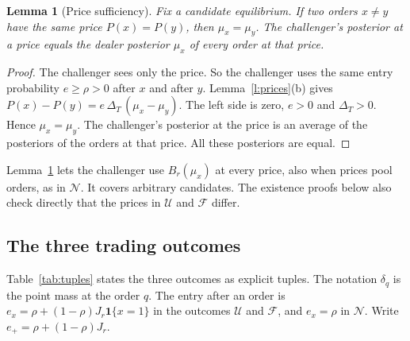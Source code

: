 \documentclass[12pt]{article}
\newtheorem{lemma}{Lemma}
\theoremstyle{definition}
\newcommand{\one}{\mathbf 1}
\begin{document}
\begin{lemma}[Price sufficiency]\label{l:suff}
Fix a candidate equilibrium.
If two orders $x\ne y$ have the same price $P(x)=P(y)$, then $\mu_x=\mu_y$.
The challenger's posterior at a price equals the dealer posterior $\mu_x$ of every order at that price.
\end{lemma}

\begin{proof}
The challenger sees only the price.
So the challenger uses the same entry probability $e\ge\rho>0$ after $x$ and after $y$.
Lemma~\ref{l:prices}(b) gives $P(x)-P(y)=e\,\Delta_T\,(\mu_x-\mu_y)$.
The left side is zero, $e>0$ and $\Delta_T>0$.
Hence $\mu_x=\mu_y$.
The challenger's posterior at the price is an average of the posteriors of the orders at that price.
All these posteriors are equal.
\end{proof}

Lemma~\ref{l:suff} lets the challenger use $B_r(\mu_x)$ at every price, also when prices pool orders, as in $\mathcal N$.
It covers arbitrary candidates.
The existence proofs below also check directly that the prices in $\mathcal U$ and $\mathcal F$ differ.

\subsection{The three trading outcomes}

Table~\ref{tab:tuples} states the three outcomes as explicit tuples.
The notation $\delta_q$ is the point mass at the order $q$.
The entry after an order is $e_x=\rho+(1-\rho)J_r\one\{x=1\}$ in the outcomes $\mathcal U$ and $\mathcal F$, and $e_x=\rho$ in $\mathcal N$.
Write $e_+=\rho+(1-\rho)J_r$.
\end{document}
